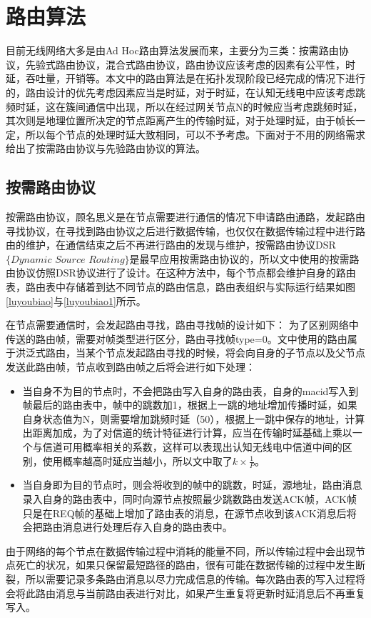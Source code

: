 \documentclass[a4paper,AutoFakeBold,oneside,12pt]{book}
\begin{document}
  \section{路由算法}
  目前无线网络大多是由Ad Hoc路由算法发展而来，主要分为三类：按需路由协议，先验式路由协议，混合式路由协议，路由协议应该考虑的因素有公平性，时延，吞吐量，开销等。本文中的路由算法是在拓扑发现阶段已经完成的情况下进行的，路由设计的优先考虑因素应当是时延，对于时延，在认知无线电中应该考虑跳频时延，这在簇间通信中出现，所以在经过网关节点N的时候应当考虑跳频时延，其次则是地理位置所决定的节点距离产生的传输时延，对于处理时延，由于帧长一定，所以每个节点的处理时延大致相同，可以不予考虑。下面对于不用的网络需求给出了按需路由协议与先验路由协议的算法。
  \subsection{按需路由协议}
  按需路由协议，顾名思义是在节点需要进行通信的情况下申请路由通路，发起路由寻找协议，在寻找到路由协议之后进行数据传输，也仅仅在数据传输过程中进行路由的维护，在通信结束之后不再进行路由的发现与维护，按需路由协议DSR$\{Dynamic$ $ Source$ $ Routing\}$是最早应用按需路由协议的，所以文中使用的按需路由协议仿照DSR协议进行了设计。在这种方法中，每个节点都会维护自身的路由表，路由表中存储着到达不同节点的路由信息，路由表组织与实际运行结果如图\ref{luyoubiao}与\ref{luyoubiao1}所示。
   
  在节点需要通信时，会发起路由寻找，路由寻找帧的设计如下：
  为了区别网络中传送的路由帧，需要对帧类型进行区分，路由寻找帧type=0。文中使用的路由属于洪泛式路由，当某个节点发起路由寻找的时候，将会向自身的子节点以及父节点发送此路由帧，节点收到路由帧之后将会进行如下处理：
  \begin{itemize}
  \item 当自身不为目的节点时，不会把路由写入自身的路由表，自身的macid写入到帧最后的路由表中，帧中的跳数加1，根据上一跳的地址增加传播时延，如果自身状态值为N，则需要增加跳频时延（50），根据上一跳中保存的地址，计算出距离加成，为了对信道的统计特征进行计算，应当在传输时延基础上乘以一个与信道可用概率相关的系数，这样可以表现出认知无线电中信道中间的区别，使用概率越高时延应当越小，所以文中取了$k\times\frac{1}{P}$。
  \item 当自身即为目的节点时，则会将收到的帧中的跳数，时延，源地址，路由消息录入自身的路由表中，同时向源节点按照最少跳数路由发送ACK帧，ACK帧只是在REQ帧的基础上增加了路由表的消息，在源节点收到该ACK消息后将会把路由消息进行处理后存入自身的路由表中。
  \end{itemize}
  由于网络的每个节点在数据传输过程中消耗的能量不同，所以传输过程中会出现节点死亡的状况，如果只保留最短路径的路由，很有可能在数据传输的过程中发生断裂，所以需要记录多条路由消息以尽力完成信息的传输。每次路由表的写入过程将会将此路由消息与当前路由表进行对比，如果产生重复将更新时延消息后不再重复写入。
  
\end{document}
